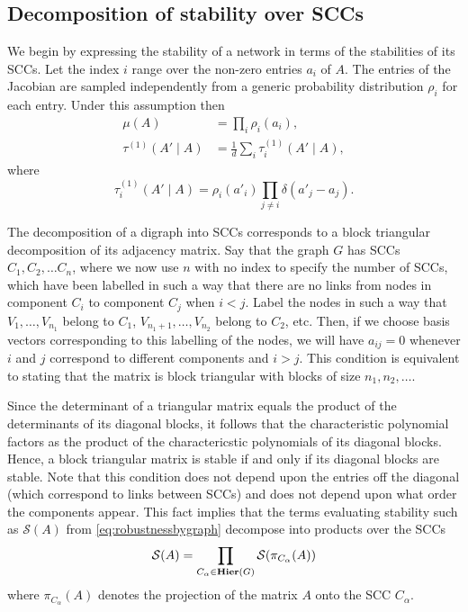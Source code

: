 \subsection{Decomposition of stability over SCCs}
We begin by expressing the stability of a network in terms of the stabilities of its SCCs. Let the index $i$ range over the non-zero entries $a_i$ of $A$. The entries of the Jacobian are sampled independently from a generic probability distribution $\rho_i$ for each entry. Under this assumption then
\begin{equation}\label{eq:singleresamplemutau}
\begin{aligned}
\mu(A) &= \prod_i \rho_i(a_i),\\
\tau^{(1)}(A' \mid A) &= \frac{1}{d} \sum_i \tau^{(1)}_i (A' \mid A),
\end{aligned}
\end{equation}
where
$$
\tau^{(1)}_i(A' \mid A) = \rho_i(a'_i) \prod_{j \neq i} \delta(a'_j - a_j).
$$

The decomposition of a digraph into SCCs corresponds to a block triangular decomposition of its adjacency matrix.  Say that the graph $G$ has SCCs $C_1, C_2, \ldots C_n$, where we now use $n$ with no index to specify the number of SCCs, which have been labelled in such a way that there are no links from nodes in component $C_i$ to component $C_j$ when $i < j$.  Label the nodes in such a way that $V_1, \ldots, V_{n_1}$ belong to $C_1$, $V_{n_1 + 1}, \ldots, V_{n_2}$ belong to $C_2$, etc.  Then, if we choose basis vectors corresponding to this labelling of the nodes, we will have $a_{ij} = 0$ whenever $i$ and $j$ correspond to different components and $i > j$.  This condition is equivalent to stating that the matrix is block triangular with blocks of size $n_1, n_2, \ldots$.

Since the determinant of a triangular matrix equals the product of the determinants of its diagonal blocks, it follows that the characteristic polynomial factors as the product of the charactericstic polynomials of its diagonal blocks.  Hence, a block triangular matrix is stable if and only if its diagonal blocks are stable.  Note that this condition does not depend upon the entries off the diagonal (which correspond to links between SCCs) and does not depend upon what order the components appear. This fact implies that the terms evaluating stability such as $\mathcal{S}(A)$ from \ref{eq:robustnessbygraph} decompose into products over the SCCs
\begin{equation}\label{eq:stabfactor}
\mathcal{S}(A) = \prod_{C_\alpha \in \mathbf{Hier}(G)} \mathcal{S}(\pi_{C_{\alpha}}(A))
\end{equation}
where $\pi_{C_{\alpha}}(A)$ denotes the projection of the matrix $A$ onto the SCC $C_{\alpha}$.

